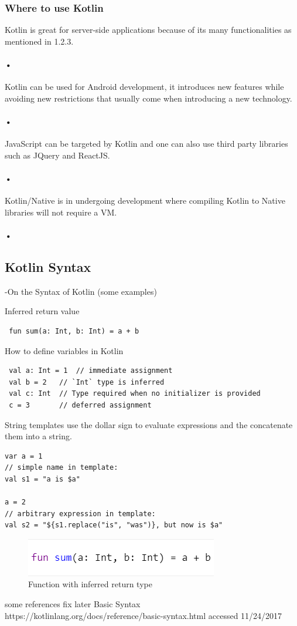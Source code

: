 \subsubsection{Where to use Kotlin}
Kotlin is great for server-side applications because of its many functionalities as mentioned in 1.2.3. \paragraph{•}
Kotlin can be used for Android development, it introduces new features while avoiding new restrictions that usually come when introducing a new technology. \paragraph{•}
JavaScript can be targeted by Kotlin and one can also use third party libraries such as JQuery and ReactJS. \paragraph{•}
Kotlin/Native is in undergoing development where compiling Kotlin to Native libraries will not require a VM. \paragraph{•}


\subsection{Kotlin Syntax}
 -On the Syntax of Kotlin (some examples)
 
 Inferred return value
 \begin{lstlisting}
 fun sum(a: Int, b: Int) = a + b
 \end{lstlisting}
 
 How to define variables in Kotlin
 \begin{lstlisting}
 val a: Int = 1  // immediate assignment
 val b = 2   // `Int` type is inferred
 val c: Int  // Type required when no initializer is provided
 c = 3       // deferred assignment
\end{lstlisting}

String templates use the dollar sign to evaluate expressions and the concatenate them into a string.
\begin{lstlisting}
var a = 1
// simple name in template:
val s1 = "a is $a" 

a = 2
// arbitrary expression in template:
val s2 = "${s1.replace("is", "was")}, but now is $a"
\end{lstlisting}
 
 
 \begin{figure}
 \centering
 \includegraphics[scale=1]{figs/InferredReturnType.png}
 \caption{Function with inferred return type}
 \label{fig:inferred return type}
\end{figure}
 
some references fix later
Basic Syntax
https://kotlinlang.org/docs/reference/basic-syntax.html
accessed 11/24/2017


